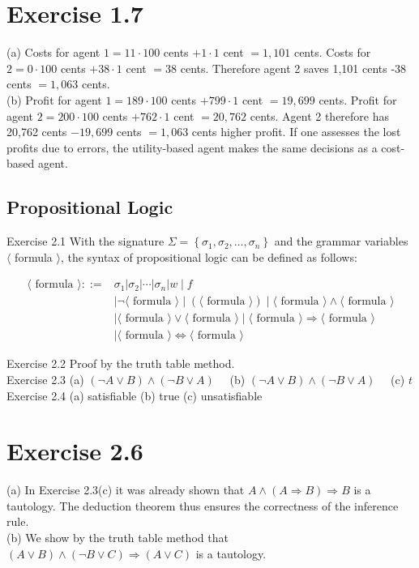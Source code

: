 \documentclass[10pt]{book}
\begin{document}
\section{Exercise 1.7}
(a) Costs for agent $1=11 \cdot 100$ cents $+1 \cdot 1$ cent $=1,101$ cents. Costs for $2=0 \cdot 100$ cents $+38 \cdot 1$ cent $=38$ cents. Therefore agent 2 saves 1,101 cents -38 cents $=1,063$ cents.\\
(b) Profit for agent $1=189 \cdot 100$ cents $+799 \cdot 1$ cent $=19,699$ cents. Profit for agent $2=200 \cdot 100$ cents $+762 \cdot 1$ cent $=20,762$ cents. Agent 2 therefore has 20,762 cents $-19,699$ cents $=1,063$ cents higher profit. If one assesses the lost profits due to errors, the utility-based agent makes the same decisions as a cost-based agent.

\subsection{Propositional Logic}
Exercise 2.1 With the signature $\Sigma=\left\{\sigma_{1}, \sigma_{2}, \ldots, \sigma_{n}\right\}$ and the grammar variables $\langle$ formula $\rangle$, the syntax of propositional logic can be defined as follows:

$$
\begin{aligned}
\langle\text { formula }\rangle::= & \sigma_{1}\left|\sigma_{2}\right| \cdots\left|\sigma_{n}\right| w \mid f \\
& \mid \neg\langle\text { formula }\rangle \mid(\langle\text { formula }\rangle) \mid\langle\text { formula }\rangle \wedge\langle\text { formula }\rangle \\
& \mid\langle\text { formula }\rangle \vee\langle\text { formula }\rangle \mid\langle\text { formula }\rangle \Rightarrow\langle\text { formula }\rangle \\
& \mid\langle\text { formula }\rangle \Leftrightarrow\langle\text { formula }\rangle
\end{aligned}
$$

Exercise 2.2 Proof by the truth table method.\\
Exercise 2.3 (a) $(\neg A \vee B) \wedge(\neg B \vee A) \quad$ (b) $(\neg A \vee B) \wedge(\neg B \vee A) \quad$ (c) $t$\\
Exercise 2.4 (a) satisfiable (b) true (c) unsatisfiable

\section{Exercise 2.6}
(a) In Exercise 2.3(c) it was already shown that $A \wedge(A \Rightarrow B) \Rightarrow B$ is a tautology. The deduction theorem thus ensures the correctness of the inference rule.\\
(b) We show by the truth table method that $(A \vee B) \wedge(\neg B \vee C) \Rightarrow(A \vee C)$ is a tautology.
\end{document}
